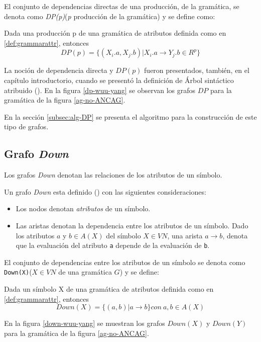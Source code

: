 El conjunto de dependencias directas de una producción, de la gramática, se denota como \textit{DP(p)}(\textit{p} producción de la gramática) y se define como:
\begin{definition}
Dada una producción p de una gramática de atributos definida como en \ref{def:grammarattr}, entonces
\begin{equation}
DP(p) = \{(X_{i}.a, X_{j}.b) | X_{i}.a \rightarrow Y_{j}.b \in R^{p} \}
\end{equation}
\end{definition}

La noción de dependencia directa y $DP(p)$ fueron presentados, también, en el capítulo introductorio, cuando se presentó la definición de Árbol sintáctico atribuido (\label{def:ast-attr}).  
En la figura \ref{dp-wuu-yang} se observan los grafos $DP$ para la gramática de la figura \ref{ag-no-ANCAG}.

En la sección \ref{subsec:alg-DP} se presenta el algoritmo para la construcción de este tipo de grafos.

\subsection{Grafo \textit{Down}}
\label{subsec:graph-down-def}
Los grafos \textit{Down} denotan las relaciones de los atributos de un símbolo. 

Un grafo \textit{Down} esta definido (\cite{estruc-algorit}) con las siguientes consideraciones: 

\begin{itemize}
\item Los nodos denotan \textit{atributos} de un símbolo.
\item Las aristas denotan la dependencia entre los atributos de un símbolo. Dado los atributos $a$ y $b\in A(X)$ del símbolo $X\in VN$, una arista $a\rightarrow b$, denota que la evaluación del atributo \texttt{a} depende de la evaluación de \texttt{b}. 
\end{itemize}
El conjunto de dependencias entre los atributos de un símbolo se denota como  
\texttt{Down(X)}($X\in VN$ de una gramática $G$) y se define:
\begin{definition}
Dada un símbolo X de una gramática de atributos definida como en \ref{def:grammarattr}, entonces
\begin{equation}
Down(X) = \{(a,b) | a \rightarrow b \} con\ a,b \in A(X)
\end{equation}
\end{definition}
En la figura \ref{down-wuu-yang} se muestran los grafos $Down(X)$ y $Down(Y)$ para la gramática de la figura \ref{ag-no-ANCAG}.

